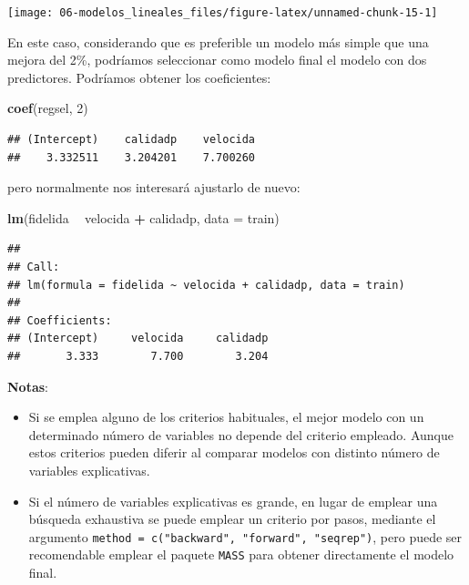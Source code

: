 \documentclass[
  spanish,
]{book}
\newenvironment{Shaded}{\begin{snugshade}}{\end{snugshade}}
\newcommand{\DataTypeTok}[1]{\textcolor[rgb]{0.13,0.29,0.53}{#1}}
\newcommand{\DecValTok}[1]{\textcolor[rgb]{0.00,0.00,0.81}{#1}}
\newcommand{\KeywordTok}[1]{\textcolor[rgb]{0.13,0.29,0.53}{\textbf{#1}}}
\newcommand{\NormalTok}[1]{#1}
\newcommand{\OperatorTok}[1]{\textcolor[rgb]{0.81,0.36,0.00}{\textbf{#1}}}
\newcommand{\StringTok}[1]{\textcolor[rgb]{0.31,0.60,0.02}{#1}}
\theoremstyle{break}
\theoremstyle{definition}
\theoremstyle{definition}
\theoremstyle{definition}
\theoremstyle{remark}
\begin{document}
\begin{center}\texttt{[image: 06-modelos\_lineales\_files/figure-latex/unnamed-chunk-15-1]} \end{center}

En este caso, considerando que es preferible un modelo más simple que una mejora del 2\%, podríamos seleccionar como modelo final el modelo con dos predictores.
Podríamos obtener los coeficientes:

\begin{Shaded}
\begin{Highlighting}[]
\KeywordTok{coef}\NormalTok{(regsel, }\DecValTok{2}\NormalTok{)}
\end{Highlighting}
\end{Shaded}

\begin{verbatim}
## (Intercept)    calidadp    velocida 
##    3.332511    3.204201    7.700260
\end{verbatim}

pero normalmente nos interesará ajustarlo de nuevo:

\begin{Shaded}
\begin{Highlighting}[]
\KeywordTok{lm}\NormalTok{(fidelida }\OperatorTok{~}\StringTok{ }\NormalTok{velocida }\OperatorTok{+}\StringTok{ }\NormalTok{calidadp, }\DataTypeTok{data =}\NormalTok{ train)}
\end{Highlighting}
\end{Shaded}

\begin{verbatim}
## 
## Call:
## lm(formula = fidelida ~ velocida + calidadp, data = train)
## 
## Coefficients:
## (Intercept)     velocida     calidadp  
##       3.333        7.700        3.204
\end{verbatim}

\textbf{Notas}:

\begin{itemize}
\item
  Si se emplea alguno de los criterios habituales, el mejor modelo con un determinado
  número de variables no depende del criterio empleado.
  Aunque estos criterios pueden diferir al comparar modelos con distinto número de
  variables explicativas.
\item
  Si el número de variables explicativas es grande, en lugar de emplear una
  búsqueda exhaustiva se puede emplear un criterio por pasos, mediante el argumento
  \texttt{method\ =\ c("backward",\ "forward",\ "seqrep")}, pero puede ser recomendable
  emplear el paquete \texttt{MASS} para obtener directamente el modelo final.
\end{itemize}
\end{document}
